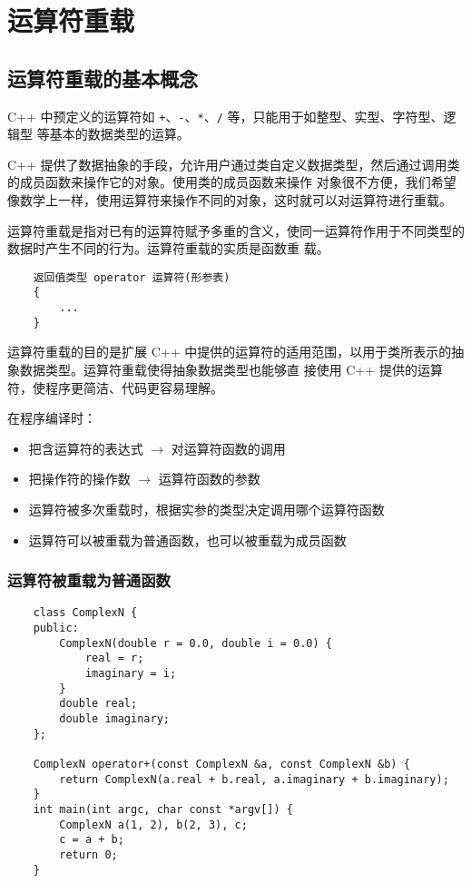 \documentclass[UTF8]{ctexart}
\begin{document}
\section{运算符重载}
\subsection{运算符重载的基本概念}
C++ 中预定义的运算符如 \texttt{+}、\texttt{-}、\texttt{*}、\texttt{/} 等，只能用于如整型、实型、字符型、逻辑型
等基本的数据类型的运算。

C++ 提供了数据抽象的手段，允许用户通过类自定义数据类型，然后通过调用类的成员函数来操作它的对象。使用类的成员函数来操作
对象很不方便，我们希望像数学上一样，使用运算符来操作不同的对象，这时就可以对运算符进行重载。

运算符重载是指对已有的运算符赋予多重的含义，使同一运算符作用于不同类型的数据时产生不同的行为。运算符重载的实质是函数重
载。
\begin{verbatim}
    返回值类型 operator 运算符(形参表)
    {
        ...
    }
\end{verbatim}

运算符重载的目的是扩展 C++ 中提供的运算符的适用范围，以用于类所表示的抽象数据类型。运算符重载使得抽象数据类型也能够直
接使用 C++ 提供的运算符，使程序更简洁、代码更容易理解。

在程序编译时：
\begin{itemize}
    \item 把含运算符的表达式 $\rightarrow$ 对运算符函数的调用
    \item 把操作符的操作数 $\rightarrow$ 运算符函数的参数
    \item 运算符被多次重载时，根据实参的类型决定调用哪个运算符函数
    \item 运算符可以被重载为普通函数，也可以被重载为成员函数
\end{itemize}

\subsubsection{运算符被重载为普通函数}
\begin{verbatim}
    class ComplexN {
    public:
        ComplexN(double r = 0.0, double i = 0.0) {
            real = r;
            imaginary = i;
        }
        double real;
        double imaginary;
    };

    ComplexN operator+(const ComplexN &a, const ComplexN &b) {
        return ComplexN(a.real + b.real, a.imaginary + b.imaginary);
    }
    int main(int argc, char const *argv[]) {
        ComplexN a(1, 2), b(2, 3), c;
        c = a + b;
        return 0;
    }
\end{verbatim}
\end{document}
